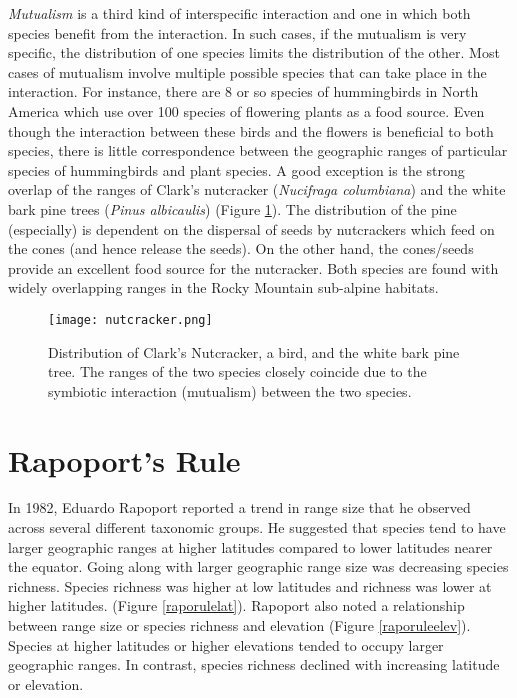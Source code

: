 \documentclass[12pt, oneside]{article}   	%
\begin{document}
\emph{Mutualism} is a third kind of interspecific interaction and one in which both species benefit from the interaction. In such cases, if the mutualism is very specific, the distribution of one species limits the distribution of the other. Most cases of mutualism involve multiple possible species that can take place in the interaction. For instance, there are 8 or so species of hummingbirds in North America which use over 100 species of flowering plants as a food source. Even though the interaction between these birds and the flowers is beneficial to both species, there is little correspondence between the geographic ranges of particular species of hummingbirds and plant species. A good exception is the strong overlap of the ranges of Clark's nutcracker (\emph{Nucifraga columbiana}) and the white bark pine trees (\emph{Pinus albicaulis}) (Figure \ref{nutcracker}). The distribution of the pine (especially) is dependent on the dispersal of seeds by nutcrackers which feed on the cones (and hence release the seeds). On the other hand, the cones/seeds provide an excellent food source for the nutcracker. Both species are found with widely overlapping ranges in the Rocky Mountain sub-alpine habitats.

\begin{figure}[tb]
	\centering
	\texttt{[image: nutcracker.png]}
	\caption{Distribution of Clark's Nutcracker, a bird, and the white bark pine tree. The ranges of the two species closely coincide due to the symbiotic interaction (mutualism) between the two species.\label{nutcracker}}
\end{figure}

\section{Rapoport's Rule}

In 1982, Eduardo Rapoport reported a trend in range size that he observed across several different taxonomic groups.  He suggested that species tend to have larger geographic ranges at higher latitudes compared to lower latitudes nearer the equator. Going along with larger geographic range size was decreasing species richness.  Species richness was higher at low latitudes and richness was lower at higher latitudes.  (Figure \ref{raporulelat}). Rapoport also noted a relationship between range size or species richness and elevation (Figure \ref{raporuleelev}).  Species at higher latitudes or higher elevations tended to occupy larger geographic ranges.  In contrast, species richness declined with increasing latitude or elevation.
\end{document}
